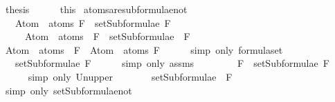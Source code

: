 \begin{isabellebody}
\ {\isacharquery}thesis\isanewline
\ \ \ \ \isamarkupfalse%
\ this\isanewline
{}\isamarkupfalse%
%
\endisatagproof
{\isafoldproof}%
%
\isadelimproof
\isanewline
%
\endisadelimproof
\isanewline
{}\isamarkupfalse%
\ atoms{\isacharunderscore}are{\isacharunderscore}subformulae{\isacharunderscore}not{\isacharcolon}\ \isanewline
\ \ \ {\isachardoublequoteopen}Atom\ {\isacharbackquote}\ atoms\ F\ {\isasymsubseteq}\ setSubformulae\ F{\isachardoublequoteclose}\ \isanewline
\ \ \ \ \ {\isachardoublequoteopen}Atom\ {\isacharbackquote}\ atoms\ {\isacharparenleft}\isactrlbold {\isasymnot}\ F{\isacharparenright}\ {\isasymsubseteq}\ setSubformulae\ {\isacharparenleft}\isactrlbold {\isasymnot}\ F{\isacharparenright}{\isachardoublequoteclose}\isanewline
%
\isadelimproof
%
\endisadelimproof
%
\isatagproof
{}\isamarkupfalse%
\ {\isacharminus}\isanewline
\ \ \isamarkupfalse%
\ {\isachardoublequoteopen}Atom\ {\isacharbackquote}\ atoms\ {\isacharparenleft}\isactrlbold {\isasymnot}\ F{\isacharparenright}\ {\isacharequal}\ Atom\ {\isacharbackquote}\ atoms\ F{\isachardoublequoteclose}\isanewline
\ \ \ \ \isamarkupfalse%
\ {\isacharparenleft}simp\ only{\isacharcolon}\ formula{\isachardot}set{\isacharparenleft}{}{\isacharparenright}{\isacharparenright}\isanewline
\ \ \isamarkupfalse%
\ \isamarkupfalse%
\ {\isachardoublequoteopen}{\isasymdots}\ {\isasymsubseteq}\ setSubformulae\ F{\isachardoublequoteclose}\isanewline
\ \ \ \ \isamarkupfalse%
\ {\isacharparenleft}simp\ only{\isacharcolon}\ assms{\isacharparenright}\isanewline
\ \ \isamarkupfalse%
\ \isamarkupfalse%
\ {\isachardoublequoteopen}{\isasymdots}\ {\isasymsubseteq}\ {\isacharbraceleft}\isactrlbold {\isasymnot}\ F{\isacharbraceright}\ {\isasymunion}\ setSubformulae\ F{\isachardoublequoteclose}\isanewline
\ \ \ \ \isamarkupfalse%
\ {\isacharparenleft}simp\ only{\isacharcolon}\ Un{\isacharunderscore}upper{}{\isacharparenright}\isanewline
\ \ \isamarkupfalse%
\ \isamarkupfalse%
\ {\isachardoublequoteopen}{\isasymdots}\ {\isacharequal}\ setSubformulae\ {\isacharparenleft}\isactrlbold {\isasymnot}\ F{\isacharparenright}{\isachardoublequoteclose}\isanewline
\ \ \ \ \isamarkupfalse%
\ {\isacharparenleft}simp\ only{\isacharcolon}\ setSubformulae{\isacharunderscore}not{\isacharparenright}\isanewline
\ \ \isamarkupfalse%

\end{isabellebody}
